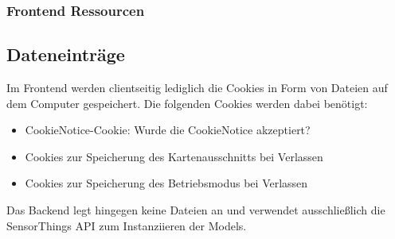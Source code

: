 \subsubsection{Frontend Ressourcen}

\subsection{Dateneinträge}
Im Frontend werden clientseitig lediglich die \glspl{Cookie} in Form von Dateien auf dem Computer gespeichert.
Die folgenden Cookies werden dabei benötigt:
\begin{itemize}
        \item \gls{CookieNotice}-\gls{Cookie}: Wurde die \gls{CookieNotice} akzeptiert?
        \item \glspl{Cookie} zur Speicherung des Kartenausschnitts bei Verlassen
        \item \glspl{Cookie} zur Speicherung des Betriebsmodus bei Verlassen
\end{itemize}
Das Backend legt hingegen keine Dateien an und verwendet ausschließlich die \gls{SensorThings API} zum Instanziieren der Models.
